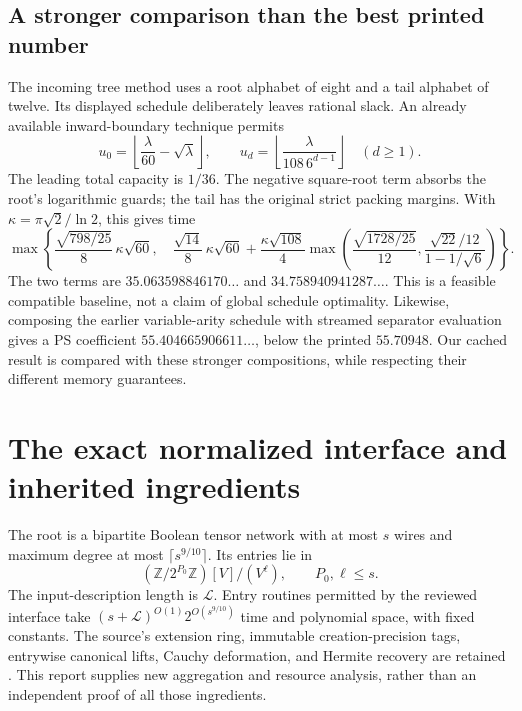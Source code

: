 \documentclass[11pt]{article}
\theoremstyle{remark}\newtheorem{remark}[theorem]{Remark}
\begin{document}
\subsection{A stronger comparison than the best printed number}
The incoming tree method uses a root alphabet of eight and a tail alphabet
of twelve. Its displayed schedule deliberately leaves rational slack.
An already available inward-boundary technique permits
\[
 u_0=\left\lfloor\frac{\lambda}{60}-\sqrt\lambda\right\rfloor,
 \qquad u_d=\left\lfloor\frac{\lambda}{108\,6^{d-1}}\right\rfloor
 \quad(d\ge1).
\]
The leading total capacity is $1/36$. The negative square-root term absorbs
the root's logarithmic guards; the tail has the original strict packing
margins. With $\kappa=\pi\sqrt2/\ln2$, this gives time
\[
 \max\left\{
 \frac{\sqrt{798/25}}8\,\kappa\sqrt{60},\quad
 \frac{\sqrt{14}}8\,\kappa\sqrt{60}
 +\frac{\kappa\sqrt{108}}4
 \max\left(\frac{\sqrt{1728/25}}{12},
 \frac{\sqrt{22}/12}{1-1/\sqrt6}\right)\right\}.
\]
The two terms are $35.063598846170\ldots$ and
$34.758940941287\ldots$. This is a feasible compatible baseline, not a
claim of global schedule optimality. Likewise, composing the earlier
variable-arity schedule with streamed separator evaluation gives a PS
coefficient $55.404665906611\ldots$, below the printed $55.70948$.
Our cached result is compared with these stronger compositions, while
respecting their different memory guarantees.

\section{The exact normalized interface and inherited ingredients}
\label{sec:interface}

The root is a bipartite Boolean tensor network with at most $s$ wires and
maximum degree at most $\lceil s^{9/10}\rceil$. Its entries lie in
\[
 (\mathbb Z/2^{P_0}\mathbb Z)[V]/(V^\ell),\qquad P_0,\ell\le s.
\]
The input-description length is $\mathcal L$. Entry routines permitted by
the reviewed interface take $(s+\mathcal L)^{O(1)}2^{O(s^{9/10})}$ time
and polynomial space, with fixed constants. The source's extension ring,
immutable creation-precision tags, entrywise canonical lifts, Cauchy
deformation, and Hermite recovery are retained \cite{upstream,asymmetric,tree}.
This report supplies new aggregation and resource analysis, rather than an
independent proof of all those ingredients.
\end{document}
